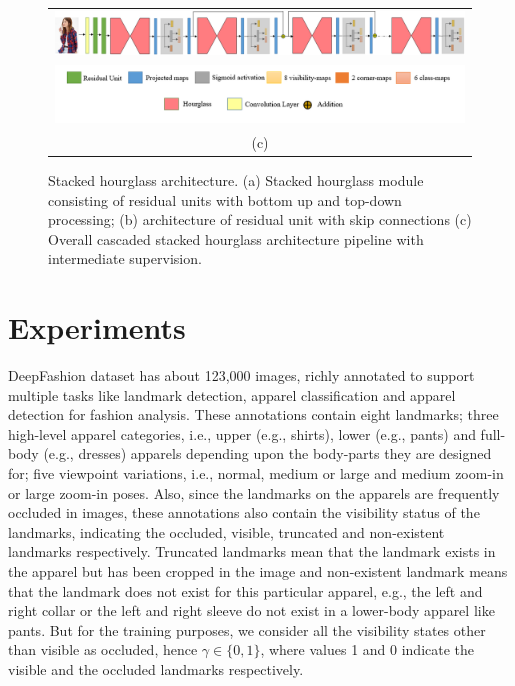 \documentclass[conference]{IEEEtran}
\begin{document}
\begin{figure}[ht]
\begin{tabular}{c}
{\includegraphics[width = 1\textwidth, height=0.1\textheight]{images/stack.png}} \\
{\includegraphics[width = 1\textwidth, height=0.1\textheight]{images/legends.PNG}} \\
(c)
\label{fig:my_label71}
\end{tabular}
\caption{Stacked hourglass architecture. (a) Stacked hourglass module consisting of residual units with bottom up and top-down processing; (b) architecture of residual unit with skip connections (c) Overall cascaded stacked hourglass architecture pipeline with intermediate supervision. }
\end{figure}


\section{Experiments}
 DeepFashion dataset has about 123,000 images, richly annotated to support multiple tasks like landmark detection, apparel classification and apparel detection for fashion analysis.
 These annotations contain eight landmarks; three high-level apparel categories, i.e., upper (e.g., shirts), lower (e.g., pants) and full-body (e.g., dresses) apparels depending upon the body-parts they are designed for; five viewpoint variations, i.e., normal, medium or large and medium zoom-in or large zoom-in poses.
Also, since the landmarks on the apparels are frequently occluded in images, these annotations also contain the visibility status of the landmarks, indicating the occluded, visible, truncated and non-existent landmarks respectively. Truncated landmarks mean that the landmark exists in the apparel but has been cropped in the image and non-existent landmark means that the landmark does not exist for this particular apparel, e.g., the left and right collar or the left and right sleeve do not exist in a lower-body apparel like pants. 
But for the training purposes, we consider all the visibility states other than visible as occluded, hence  $\gamma \in \{0,1\}$, where values 1 and 0 indicate the visible and the occluded landmarks respectively. 
 
\end{document}

